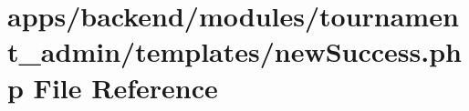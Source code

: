 \hypertarget{backend_2modules_2tournament__admin_2templates_2new_success_8php}{\section{apps/backend/modules/tournament\-\_\-admin/templates/new\-Success.php File Reference}
\label{backend_2modules_2tournament__admin_2templates_2new_success_8php}
}
